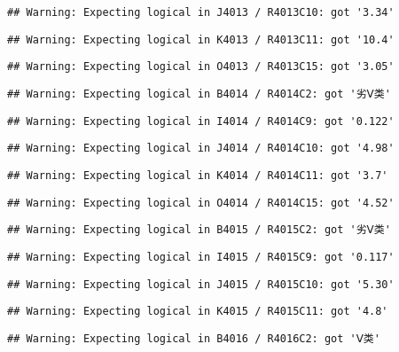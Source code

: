 \documentclass[
]{article}
\begin{document}
\begin{verbatim}
## Warning: Expecting logical in J4013 / R4013C10: got '3.34'
\end{verbatim}

\begin{verbatim}
## Warning: Expecting logical in K4013 / R4013C11: got '10.4'
\end{verbatim}

\begin{verbatim}
## Warning: Expecting logical in O4013 / R4013C15: got '3.05'
\end{verbatim}

\begin{verbatim}
## Warning: Expecting logical in B4014 / R4014C2: got '劣Ⅴ类'
\end{verbatim}

\begin{verbatim}
## Warning: Expecting logical in I4014 / R4014C9: got '0.122'
\end{verbatim}

\begin{verbatim}
## Warning: Expecting logical in J4014 / R4014C10: got '4.98'
\end{verbatim}

\begin{verbatim}
## Warning: Expecting logical in K4014 / R4014C11: got '3.7'
\end{verbatim}

\begin{verbatim}
## Warning: Expecting logical in O4014 / R4014C15: got '4.52'
\end{verbatim}

\begin{verbatim}
## Warning: Expecting logical in B4015 / R4015C2: got '劣Ⅴ类'
\end{verbatim}

\begin{verbatim}
## Warning: Expecting logical in I4015 / R4015C9: got '0.117'
\end{verbatim}

\begin{verbatim}
## Warning: Expecting logical in J4015 / R4015C10: got '5.30'
\end{verbatim}

\begin{verbatim}
## Warning: Expecting logical in K4015 / R4015C11: got '4.8'
\end{verbatim}

\begin{verbatim}
## Warning: Expecting logical in B4016 / R4016C2: got 'Ⅴ类'
\end{verbatim}
\end{document}
